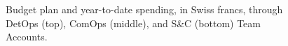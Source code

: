 \begin{figure}[hbtp]
  \begin{center}
    \caption{Budget plan and year-to-date spending, in Swiss francs, through DetOps (top), ComOps (middle),
and S\&C (bottom) Team Accounts.}
    \label{fig:Team_Accounts}
  \end{center}
\end{figure}

\clearpage
